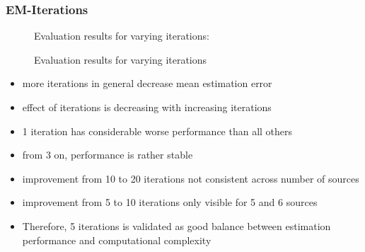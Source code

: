 \clearpage
\subsubsection{EM-Iterations}

% 	       
% 	       

\begin{figure}[H]
    \setlength\figureheight{7cm}
    \small
    \setlength\figurewidth{\textwidth}
	\centering
	\begin{tikzpicture}
	    \footnotesize
	    
	    
	\end{tikzpicture}
	
	\caption[Evaluation results for varying  iterations]{Evaluation results for varying  iterations: }
	\label{fig:trial1}
\end{figure}

 \begin{figure}[H]
     \setlength\figureheight{5cm}
     \setlength{}
 	\centering
 	
 	\caption[Evaluation results for varying  iterations]{Evaluation results for varying  iterations}
 	\label{fig:trial1}
 \end{figure}


\begin{itemize}
\item more iterations in general decrease mean estimation error
\item effect of iterations is decreasing with increasing iterations
\item 1 iteration has considerable worse performance than all others
\item from 3 on, performance is rather stable
\item improvement from 10 to 20 iterations not consistent across number of sources 
\item improvement from 5 to 10 iterations only visible for 5 and 6 sources
\item Therefore, 5 iterations is validated as good balance between estimation performance and computational complexity
\end{itemize}
